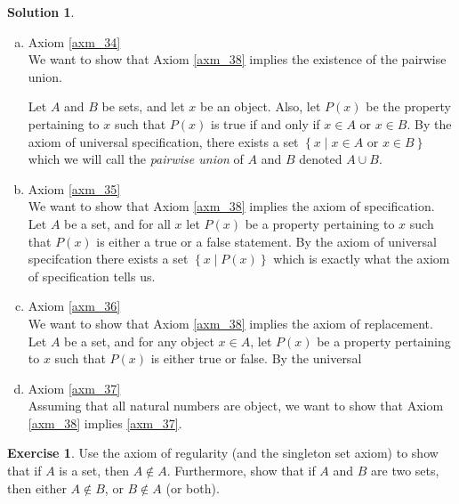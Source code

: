 \documentclass[a4paper, twocolumn]{report}
\newcounter{exercise} \numberwithin{exercise}{section}
\theoremstyle{definition}
\newtheorem{exc}[exercise]{Exercise}
\theoremstyle{solution}
\newtheorem*{sltn}{Solution}
\newcommand{\union}{\cup}
\begin{document}
\begin{sltn}
\begin{enumerate}[(a)]
    \item Axiom \ref{axm_34} \\
      [0.2cm]
      We want to show that Axiom \ref{axm_38} implies the existence of the pairwise union.

      Let $A$ and $B$ be sets, and let $x$ be an object. Also, let $P(x)$ be
      the property pertaining to $x$ such that $P(x)$ is true if and only if
      $x \in A$ or $x \in B$. By the axiom of universal specification, there
      exists a set $\left\{ x \mid x \in A \text{ or } x \in B \right\}$ which
      we will call the \textit{pairwise union} of $A$ and $B$ denoted $A \union
      B$.

    \item Axiom \ref{axm_35} \\
      [0.2cm]
      We want to show that Axiom \ref{axm_38} implies the axiom of
      specification.  Let $A$ be a set, and for all $x$ let $P(x)$ be a
      property pertaining to $x$ such that $P(x)$ is either a true or a false
      statement. By the axiom of universal specifcation there exists a set
      $\left\{ x \mid P(x) \right\}$ which is exactly what the axiom of
      specification tells us.

    \item Axiom \ref{axm_36}\\
      [0.2cm]
      We want to show that Axiom \ref{axm_38} implies the axiom of replacement.
      Let $A$ be a set, and for any object $x \in A$, let $P(x)$ be a property pertaining
      to $x$ such that $P(x)$ is either true or false. By the universal 

    \item Axiom \ref{axm_37}\\
      [0.2cm]
      Assuming that all natural numbers are object, we want to show that Axiom
      \ref{axm_38} implies \ref{axm_37}. 
  \end{enumerate}


\end{sltn}

\begin{exc}
  Use the axiom of regularity (and the singleton set axiom) to show that if $A$
  is a set, then $A \notin A$. Furthermore, show that if $A$ and $B$ are two
  sets, then either $A \notin B$, or $B \notin A$ (or both).
\end{exc}
\end{document}

